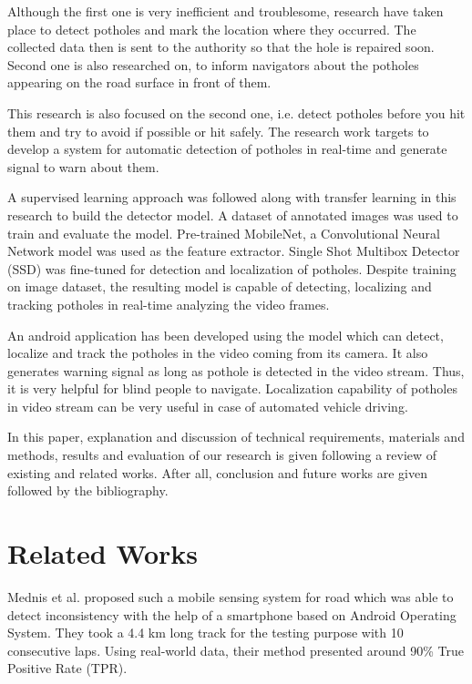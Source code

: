 \documentclass[conference]{IEEEtran}
\begin{document}
Although the first one is very inefficient and troublesome, research have taken place to detect potholes and mark the location where they occurred\cite{yu06,zoysa07,li09,buza2013stereo,koch11}. The collected data then is sent to the authority so that the hole is repaired soon. Second one is also researched on\cite{rao16,danti12}, to inform navigators about the potholes appearing on the road surface in front of them.
  
This research is also focused on the second one, i.e. detect potholes before you hit them and try to avoid if possible or hit safely. The research work targets to develop a system for automatic detection of potholes in real-time and generate signal to warn about them.
  
A supervised learning approach\cite{kotsiantis2007supervised} was followed along with transfer learning\cite{pan2009survey} in this research to build the detector model. A dataset of annotated images was used to train and evaluate the model. Pre-trained MobileNet\cite{howard2017mobilenets}, a Convolutional Neural Network model was used as the feature extractor. Single Shot Multibox Detector (SSD)\cite{liu2016ssd} was fine-tuned for detection and localization of potholes. Despite training on image dataset, the resulting model is capable of detecting, localizing and tracking potholes in real-time analyzing the video frames.
  
An android application has been developed using the model which can detect, localize and track the potholes in the video coming from its camera. It also generates warning signal as long as pothole is detected in the video stream. Thus, it is very helpful for blind people to navigate. Localization capability of potholes in video stream can be very useful in case of automated vehicle driving.
  
In this paper, explanation and discussion of technical requirements, materials and methods, results and evaluation of our research is given following a review of existing and related works. After all, conclusion and future works are given followed by the bibliography.
  
\section{Related Works}
Mednis et al. proposed such a mobile sensing system for road\cite{rao16} which was able to detect inconsistency with the help of a smartphone based on Android Operating System\cite{mednis11,rao16}. They took a 4.4 km long track for the testing purpose with 10 consecutive laps. Using real-world data, their method presented around 90\% True Positive Rate (TPR)\cite{kim14}.
    
\end{document}
